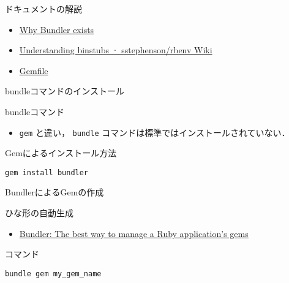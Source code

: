 \documentclass[t, aspectratio=169]{beamer}
\begin{document}
\begin{frame}[label=sec-4-2-2]{ドキュメントの解説}
\begin{itemize}
\item \href{http://bundler.io/rationale.html}{Why Bundler exists}
\item \href{https://github.com/sstephenson/rbenv/wiki/Understanding-binstubs}{Understanding binstubs · sstephenson/rbenv Wiki}
\item \href{http://bundler.io/gemfile.html}{Gemfile}
\end{itemize}
\end{frame}

\begin{frame}[fragile,label=sec-4-2-3]{bundleコマンドのインストール}
 \begin{block}{bundleコマンド}
\begin{itemize}
\item \texttt{gem} と違い， \texttt{bundle} コマンドは標準ではインストールされていない．
\end{itemize}
\end{block}

\begin{block}{Gemによるインストール方法}
\begin{verbatim}
gem install bundler
\end{verbatim}
\end{block}
\end{frame}
\begin{frame}[fragile,label=sec-4-2-4]{BundlerによるGemの作成}
 \begin{block}{ひな形の自動生成}
\begin{itemize}
\item \href{http://bundler.io/v1.7/bundle_gem.html}{Bundler: The best way to manage a Ruby application's gems}
\end{itemize}
\end{block}

\begin{block}{コマンド}
\begin{verbatim}
bundle gem my_gem_name
\end{verbatim}
\end{block}
\end{frame}
\end{document}

